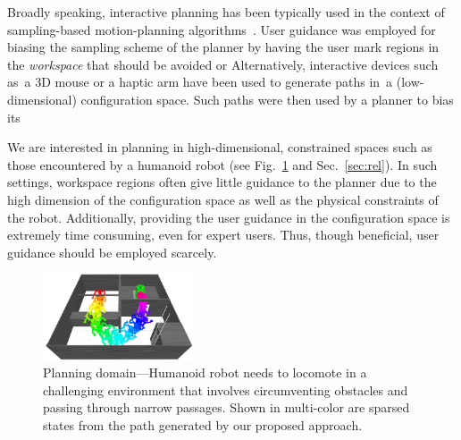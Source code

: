 \documentclass{article}
\begin{document}
Broadly speaking, interactive planning has been typically used in the context of sampling-based motion-planning algorithms~\cite{L06}.
User guidance was employed for biasing the sampling scheme of the planner by having the user mark regions in the \emph{workspace} that should be avoided or 
Alternatively, interactive devices such as~a 3D mouse or a haptic arm have been used to generate paths in~a (low-dimensional) configuration space. Such paths were then used by a planner to bias its 

We are interested in planning in high-dimensional, constrained spaces such as those encountered by a humanoid robot (see Fig.~\ref{fig:robot} and Sec.~\ref{sec:rel}).
In such settings, workspace regions often give little guidance to the planner due to the high dimension of the configuration space as well as the physical constraints of the robot.
Additionally, providing the user guidance in the configuration space is extremely time consuming, even for expert users.
Thus,  though beneficial, user guidance should be employed scarcely.

\begin{figure}[tb]
  \centering
  	\includegraphics[width=0.4\textwidth]{fig/cover.png}
  	\vspace{-2mm}
  \caption{
  Planning domain---Humanoid robot needs to locomote in a challenging environment that involves circumventing obstacles and passing through narrow passages. Shown in multi-color are sparsed states from the path generated by our proposed approach.
}
   	\label{fig:robot}
\vspace{-3mm}
\end{figure}
\end{document}
